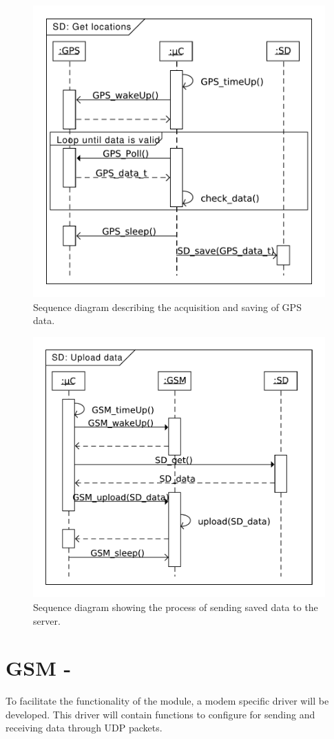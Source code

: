 \begin{figure}
	\centering
	\includegraphics[width=0.7\linewidth]{gfx/Design/SD_getLocation.pdf}
	\caption{Sequence diagram describing the acquisition and saving of GPS data.}
	\label{fig:SD:getlocation}
\end{figure}

\begin{figure}
	\centering
	\includegraphics[width=0.7\linewidth]{gfx/Design/SD_Upload.pdf}
	\caption{Sequence diagram showing the process of sending saved data to the server.}
	\label{fig:SD:upload}
\end{figure}

\section{GSM - \SARA}
To facilitate the functionality of the \SARA module, a modem specific driver will be developed. This driver will contain functions to configure \SARA for sending and receiving data through UDP packets.

